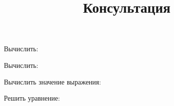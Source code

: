 \newpage
\title{Консультация}
\begin{listofex}
	\item Вычислить:
	\begin{enumcols}[itemcolumns=2]
		\item {}
		\item {}
		\item {}
		\item {}
		\item {}
	\end{enumcols}
	\item Вычислить:
	\begin{enumcols}[itemcolumns=2]
		\item {}
		\item {}
	\end{enumcols}
	\item Вычислить значение выражения:
	\begin{enumcols}[itemcolumns=2]
		\item {}
		\item {}
	\end{enumcols}
	\item Решить уравнение:
	\begin{enumcols}[itemcolumns=2]
		\item {}
		\item {}
		\item {}
		\item {}
		\item {}
		\item {}
		\item {}
	\end{enumcols}
\end{listofex}